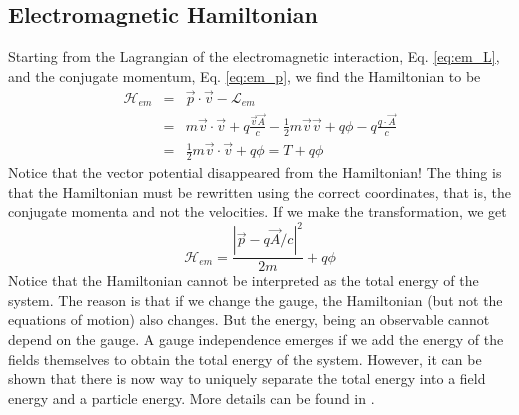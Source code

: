 \documentclass[11pt,fleqn]{book} %
\begin{document}
\subsection*{Electromagnetic Hamiltonian}
Starting from the Lagrangian of the electromagnetic interaction, Eq. \ref{eq:em_L}, and the conjugate momentum, Eq. \ref{eq:em_p}, we find
the Hamiltonian to be
\begin{eqnarray*}
    \mathcal{H}_{em} &=& \vec{p}\cdot\vec{v}-\mathcal{L}_{em} \\
    &=& m\vec{v}\cdot\vec{v}+q\frac{\vec{v}\vec{A}}{c}-\frac{1}{2}m\vec{v}\vec{v}+q\phi-q\frac{q\cdot\vec A}{c} \\
    &=& \frac{1}{2}m\vec{v}\cdot\vec{v}+q\phi = T+q\phi
\end{eqnarray*}
Notice that the vector potential disappeared from the Hamiltonian! The thing is that the Hamiltonian must be rewritten using the correct coordinates, that is,
the conjugate momenta and not the velocities. If we make the transformation, we get
\begin{equation*}
    \mathcal{H}_{em} = \frac{|\vec{p}-q\vec{A}/c|^2}{2m} + q\phi
\end{equation*}
Notice that the Hamiltonian cannot be interpreted as the total energy of the system. The reason is that if we change the gauge, the Hamiltonian (but not the equations of motion)
also changes. But the energy, being an observable cannot depend on the gauge. A gauge independence emerges if we add the energy of the fields themselves to obtain the total
energy of the system. However, it can be shown that there is now way to uniquely separate the total energy into a field energy and a particle energy. 
More details can be found in \cite{kobe}.

\printbibliography
\end{document}
